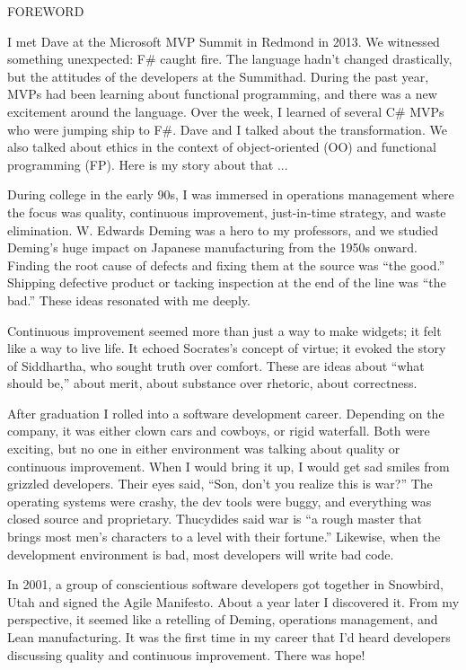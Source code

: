\documentclass{book}
\begin{document}
FOREWORD

I met Dave at the Microsoft MVP Summit in Redmond in 2013. We witnessed something unexpected: F\# caught fire. The language hadn’t changed drastically, but the attitudes of the developers at the Summithad. During the past year, MVPs had been learning about functional programming, and there was a new excitement around the language. Over the week, I learned of several C\# MVPs who were jumping ship to F\#. Dave and I talked about the transformation. We also talked about ethics in the context of object-oriented (OO) and functional programming (FP). Here is my story about that ...

During college in the early 90s, I was immersed in operations management where the focus was quality, continuous improvement, just-in-time strategy, and waste elimination. W. Edwards Deming was a hero to my professors, and we studied Deming’s huge impact on Japanese manufacturing from the 1950s onward. Finding the root cause of defects and fixing them at the source was “the good.” Shipping defective product or tacking inspection at the end of the line was “the bad.” These ideas resonated with me deeply.

Continuous improvement seemed more than just a way to make widgets; it felt like a way to live life. It echoed Socrates’s concept of virtue; it evoked the story of Siddhartha, who sought truth over comfort. These are ideas about “what should be,” about merit, about substance over rhetoric, about correctness.

After graduation I rolled into a software development career. Depending on the company, it was either clown cars and cowboys, or rigid waterfall. Both were exciting, but no one in either environment was talking about quality or continuous improvement. When I would bring it up, I would get sad smiles from grizzled developers. Their eyes said, “Son, don’t you realize this is war?” The operating systems were crashy, the dev tools were buggy, and everything was closed source and proprietary. Thucydides said war is “a rough master that brings most men’s characters to a level with their fortune.” Likewise, when the development environment is bad, most developers will write bad code.

In 2001, a group of conscientious software developers got together in Snowbird, Utah and signed the Agile Manifesto. About a year later I discovered it. From my perspective, it seemed like a retelling of Deming, operations management, and Lean manufacturing. It was the first time in my career that I’d heard developers discussing quality and continuous improvement. There was hope!
\end{document}
